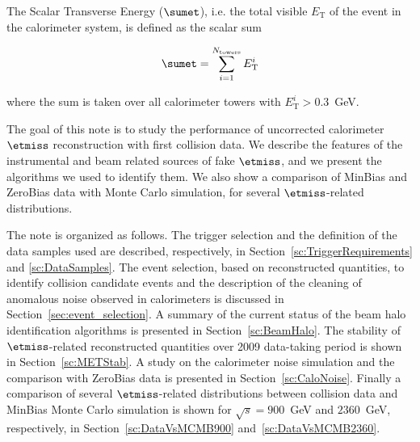 The Scalar Transverse Energy ($\sumet$), i.e. the total visible 
$E_\text{T}$ of the event in the calorimeter system, 
is defined as the scalar sum 

\begin{align}
  \label{eq:34}
  \sumet = \sum^{N_\text{towers}}_{i=1}E_\text{T}^i
\end{align}

where the sum is taken over all calorimeter towers with $E_\text{T}^i>0.3$~GeV.

The goal of this note is to study the performance of uncorrected 
calorimeter $\etmiss$ reconstruction with first collision data. 
We describe the features of the instrumental 
and beam related sources of fake $\etmiss$, and we present the algorithms we used to identify them.
We also show a comparison of MinBias and ZeroBias data with Monte Carlo simulation, for several 
$\etmiss$-related distributions.

The note is organized as follows.
The trigger selection and the definition of the data samples used are described,
respectively, in Section~\ref{sc:TriggerRequirements} and \ref{sc:DataSamples}. 
The event selection, based on reconstructed quantities, to identify collision candidate 
events and the description of the cleaning of anomalous noise observed in calorimeters 
is discussed in Section~\ref{sec:event_selection}.
A summary of the current status of the beam halo identification algorithms 
is presented in Section~\ref{sc:BeamHalo}.
The stability of $\etmiss$-related reconstructed quantities over 2009 
data-taking period is shown in Section~\ref{sc:METStab}.
A study on the calorimeter noise simulation and the comparison 
with ZeroBias data is presented in Section~\ref{sc:CaloNoise}.
Finally a comparison of several $\etmiss$-related distributions
between collision data and MinBias Monte Carlo simulation 
is shown for $\sqrt{s}=900$~GeV and $2360$~GeV, respectively, in 
Section~\ref{sc:DataVsMCMB900} and~\ref{sc:DataVsMCMB2360}.
